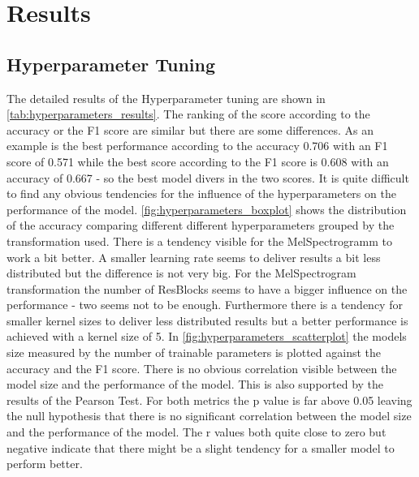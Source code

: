 


\section{Results}
\label{results}

\subsection{Hyperparameter Tuning}%

The detailed results of the Hyperparameter tuning are shown in \autoref{tab:hyperparameters_results}.
The ranking of the score according to the accuracy or the F1 score are similar but there are some differences.
As an example is the best performance according to the accuracy 0.706 with an F1 score of 0.571 while 
the best score according to the F1 score is 0.608 with an accuracy of 0.667 - so the best model
divers in the two scores.
It is quite difficult to find any obvious tendencies for the influence of the hyperparameters on the performance of the model.
\autoref{fig:hyperparameters_boxplot} shows the distribution of the accuracy comparing different different hyperparameters
grouped by the transformation used. There is a tendency visible for the MelSpectrogramm to work a bit better.
A smaller learning rate seems to deliver results a bit less distributed but the difference is not very big.
For the MelSpectrogram transformation the number of ResBlocks seems to have a bigger influence on the performance -
two seems not to be enough. Furthermore there is a tendency for smaller kernel sizes to deliver less distributed results
but a better performance is achieved with a kernel size of 5. In \autoref{fig:hyperparameters_scatterplot} the
models size measured by the number of trainable parameters is plotted against the accuracy and the F1 score.
There is no obvious correlation visible between the model size and the performance of the model.
This is also supported by the results of the Pearson Test. For both metrics the p value is far above 0.05 leaving the null hypothesis
that there is no significant correlation between the model size and the performance of the model.
The r values both quite close to zero but negative indicate that there might be a slight tendency for a smaller model to perform better.
